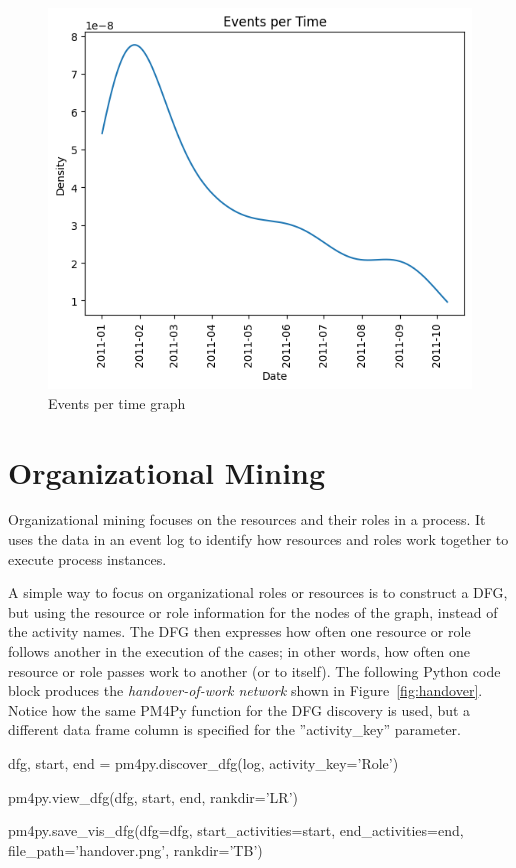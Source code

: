 \begin{figure}
\centering
\includegraphics[width=.7\textwidth]{eventspertime.png}
\caption{Events per time graph}
\label{fig:events_per_time}
\end{figure}

\FloatBarrier
\section{Organizational Mining}

Organizational mining focuses on the resources and their roles in a process. It uses the data in an event log to identify how resources and roles work together to execute process instances. 

A simple way to focus on organizational roles or resources is to construct a DFG, but using the resource or role information for the nodes of the graph, instead of the activity names. The DFG then expresses how often one resource or role follows another in the execution of the cases; in other words, how often one resource or role passes work to another (or to itself). The following Python code block produces the \emph{handover-of-work network} shown in Figure~\ref{fig:handover}. Notice how the same PM4Py function for the DFG discovery is used, but a different data frame column is specified for the ''activity\_key'' parameter.

\begin{samepage}
\begin{pythoncode}
dfg, start, end = pm4py.discover_dfg(log, activity_key='Role')

pm4py.view_dfg(dfg, start, end, rankdir='LR')

pm4py.save_vis_dfg(dfg=dfg,
    start_activities=start, 
    end_activities=end, 
    file_path='handover.png', rankdir='TB')
\end{pythoncode}
\end{samepage}

